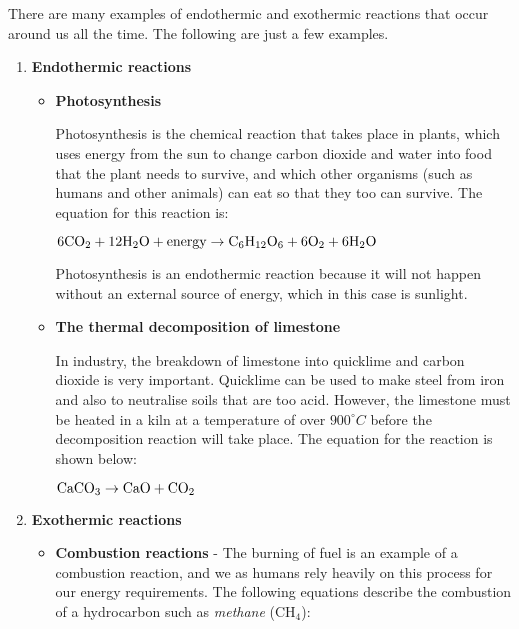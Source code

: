There are many examples of endothermic and exothermic reactions that occur around us all the time. The following are just a few examples.

\begin{enumerate}
\item{\textbf{Endothermic reactions}

\begin{itemize}
\item{\textbf{Photosynthesis}}

Photosynthesis is the chemical reaction that takes place in plants, which uses energy from the sun to change carbon dioxide and water into food that the plant needs to survive, and which other organisms (such as humans and other animals) can eat so that they too can survive. The equation for this reaction is:

\begin{center}
$\rm{6CO_{2} + 12H_{2}O + energy \rightarrow C_{6}H_{12}O_{6} + 6O_{2} + 6H_{2}O}$
\end{center}

Photosynthesis is an endothermic reaction because it will not happen without an external source of energy, which in this case is sunlight. \\

\item{\textbf{The thermal decomposition of limestone}}

In industry, the breakdown of limestone into quicklime and carbon dioxide is very important. Quicklime can be used to make steel from iron and also to neutralise soils that are too acid. However, the limestone must be heated in a kiln at a temperature of over $900^{\circ}C$ before the decomposition reaction will take place. The equation for the reaction is shown below:

\begin{center}
$\rm{CaCO_{3} \rightarrow  CaO +  CO_{2}}$
\end{center}

\end{itemize}
}

\item{\textbf{Exothermic reactions}

\begin{itemize}
\item{\textbf{Combustion reactions}} - The burning of fuel is an example of a combustion reaction, and we as humans rely heavily on this process for our energy requirements. The following equations describe the combustion of a hydrocarbon such as \textit{methane} (CH$_{4}$):


\end{itemize}}
\end{enumerate}
